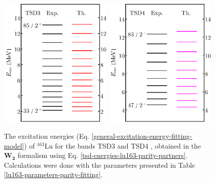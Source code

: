 \begin{figure}
    \centering
    \includegraphics[width=0.49\textwidth]{Chapters/Figures/parity-partners-plots/tsd3.pdf}
    \includegraphics[width=0.49\textwidth]{Chapters/Figures/parity-partners-plots/tsd4.pdf}
    \caption{The excitation energies (Eq. \ref{general-excitation-energy-fitting-model}) of $^{163}$Lu for the bands TSD3 and TSD4 , obtained in the $\mathbf{W_2}$ formalism using Eq. \ref{tsd-energies-lu163-parity-partners}. Calculations were done with the parameters presented in Table \ref{lu163-parameters-parity-fitting}.}
    \label{results-parity-partners-163lu-2}
\end{figure}

